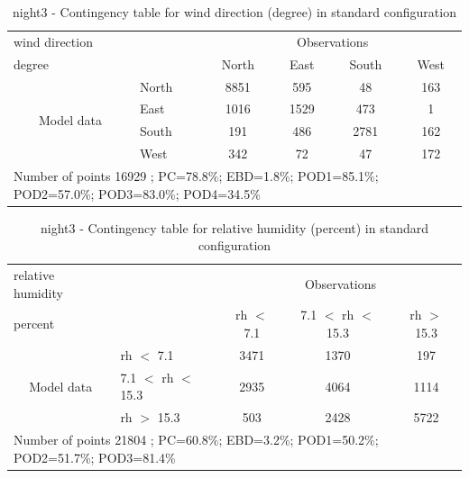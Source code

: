 \begin{table}[p!]
\begin{center}
\begin{tabular}{llcccc}
\hline
{wind direction}                                       &                             &    \multicolumn{4}{c}{Observations}                 \\
{degree}                                       &                             & {North}   & {East} & {South} & {West} \\
\hline
\multicolumn{1}{c}{\multirow{4}{*}{Model data}}  & {North}                    & 8851   & 595    & 48     & 163\\
                                                 & {East}                     & 1016   & 1529    & 473     & 1\\
                                                 & {South}                    & 191   & 486   & 2781    & 162\\
                                                 & {West}                     & 342  & 72   & 47    & 172\\
\hline 
\multicolumn{6}{l}{ Number of points        16929 ; PC=78.8\%; EBD=1.8\%; POD1=85.1\%; POD2=57.0\%; POD3=83.0\%; POD4=34.5\%}                 \\
\end{tabular}
\end{center}
\caption{night3 - Contingency table for {wind direction} (degree) in standard configuration}
\label{tab:contingencywdBEF:night3}
\end{table}
\begin{table}[p!]
\begin{center}
\begin{tabular}{llccc}
\hline
{relative humidity}                                       &                                                    & \multicolumn{3}{c}{Observations}                 \\
{percent}                                       &                             & rh $<$ 7.1   & 7.1 $<$ rh $<$ 15.3 & rh $>$ 15.3 \\
\hline
\multicolumn{1}{c}{\multirow{3}{*}{Model data}}  & rh $<$ 7.1             & 3471                & 1370                       & 197              \\
                                                 & 7.1  $<$ rh $<$ 15.3 & 2935                & 4064                       & 1114              \\
                                                 & rh $>$ 15.3             & 503                & 2428                       & 5722              \\
\hline
\multicolumn{5}{l}{ Number of points        21804 ; PC=60.8\%; EBD=3.2\%; POD1=50.2\%; POD2=51.7\%; POD3=81.4\%}
\end{tabular}
\end{center}
\caption{night3 - Contingency table for  relative humidity (percent) in standard configuration}
\label{tab:contingencyrhBEF:night3}
\end{table}
